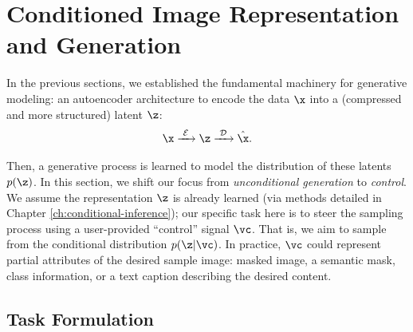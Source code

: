 \documentclass[../../book-main.tex]{subfiles}
\begin{document}
\section{Conditioned Image  Representation and Generation}
\label{sec:cond_gen}

In the previous sections, we established the fundamental machinery
for generative modeling: an autoencoder architecture to encode the
data $\x$ into a (compressed and more structured) latent $\z$:
\begin{equation}
\x\xrightarrow{\hspace{1mm} \mathcal{E} \hspace{1mm}} \z
\xrightarrow{\hspace{1mm} \mathcal{D} \hspace{1mm}} \hat{\x}.
\end{equation}

Then, a generative process is learned to model the distribution of
these latents $p(\z)$. In this section, we shift our focus from
\textit{unconditional generation} to \textit{control}. We assume the
representation $\z$ is already learned (via methods detailed in
Chapter \ref{ch:conditional-inference}); our specific task here is to
steer the sampling process using a user-provided ``control'' signal
$\vc$. That is, we aim to sample from the conditional distribution
$p(\z | \vc)$. In practice, $\vc$ could represent partial attributes
of the desired sample image: masked image, a semantic mask, class
information, or a text caption describing the desired content.

\subsection{Task Formulation}
\label{subsec:cond_problem}
\end{document}
